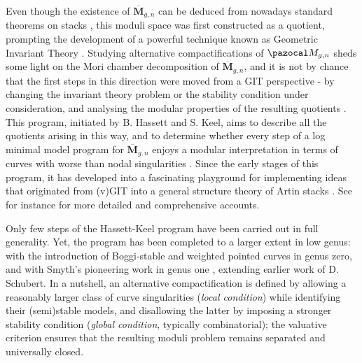 \documentclass{compositio}
\theoremstyle{plain}
\theoremstyle{definition}
\theoremstyle{remark}
\begin{document}
Even though the existence of $\overline{\mathbf M}_{g,n}$ can be deduced from nowadays standard theorems on stacks \cite{KM}, this moduli space was first constructed as a quotient, prompting the development of a powerful technique known as Geometric Invariant Theory  \cite{Gieseker,GIT,BalSwi}. Studying alternative compactifications of $\pazocal M_{g,n}$ sheds some light on the Mori chamber decomposition of $\overline{\mathbf M}_{g,n}$, and it is not by chance that the first steps in this direction were moved from a GIT perspective - by changing the invariant theory problem or the stability condition under consideration, and analysing the modular properties of the resulting quotients \cite{Schubert,Hassettg2,HassettHyeon}. This program, initiated by B. Hassett and S. Keel, aims to describe all the quotients arising in this way, and to determine whether every step of a log minimal model program for $\overline{\mathbf M}_{g,n}$ enjoys a modular interpretation in terms of curves with worse than nodal singularities \cite{CTV1,CTV2}. Since the early stages of this program, it has developed into a fascinating playground for implementing ideas that originated from (v)GIT into a general structure theory of Artin stacks \cite{AlperKresch,AFS1,AFS2,AFS3}. See for instance \cite{Morrison, FS} for more detailed and comprehensive accounts.

Only few steps of the Hassett-Keel program have been carried out in full generality. Yet, the program has been completed to a larger extent in low genus: with the introduction of Boggi-stable \cite{Boggi} and weighted pointed curves \cite{Hassettweighted} in genus zero, and with Smyth's pioneering work in genus one \cite{SMY1,SMY2,SMY3}, extending earlier work of D. Schubert. In a nutshell, an alternative compactification is defined by allowing a reasonably larger class of curve singularities (\emph{local condition}) while identifying their (semi)stable models, and disallowing the latter by imposing a stronger stability condition (\emph{global condition}, typically combinatorial); the valuative criterion ensures that the resulting moduli problem remains separated and universally closed.
\end{document}
